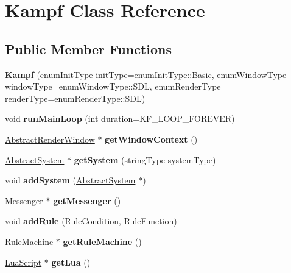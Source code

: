 \hypertarget{classKampf}{\section{Kampf Class Reference}
\label{classKampf}
}
\subsection*{Public Member Functions}
\begin{DoxyCompactItemize}
\item 
\hypertarget{classKampf_aa636c2f7549d48ab59988926e7f96153}{{\bfseries Kampf} (enum\-Init\-Type init\-Type=enum\-Init\-Type\-::\-Basic, enum\-Window\-Type window\-Type=enum\-Window\-Type\-::\-S\-D\-L, enum\-Render\-Type render\-Type=enum\-Render\-Type\-::\-S\-D\-L)}\label{classKampf_aa636c2f7549d48ab59988926e7f96153}

\item 
\hypertarget{classKampf_a52fce0360ced7a06ba48ed77b22cb339}{void {\bfseries run\-Main\-Loop} (int duration=K\-F\-\_\-\-L\-O\-O\-P\-\_\-\-F\-O\-R\-E\-V\-E\-R)}\label{classKampf_a52fce0360ced7a06ba48ed77b22cb339}

\item 
\hypertarget{classKampf_aea0f9a59c692b21d41c0de4c1f68f63d}{\hyperlink{classAbstractRenderWindow}{Abstract\-Render\-Window} $\ast$ {\bfseries get\-Window\-Context} ()}\label{classKampf_aea0f9a59c692b21d41c0de4c1f68f63d}

\item 
\hypertarget{classKampf_afcb1d4930f5697f785343d0dc51a7c85}{\hyperlink{classAbstractSystem}{Abstract\-System} $\ast$ {\bfseries get\-System} (string\-Type system\-Type)}\label{classKampf_afcb1d4930f5697f785343d0dc51a7c85}

\item 
\hypertarget{classKampf_a8461da73a68c946ebb1971810782e0b1}{void {\bfseries add\-System} (\hyperlink{classAbstractSystem}{Abstract\-System} $\ast$)}\label{classKampf_a8461da73a68c946ebb1971810782e0b1}

\item 
\hypertarget{classKampf_a8cc05244779ea8119f685a5fe19a8540}{\hyperlink{classMessenger}{Messenger} $\ast$ {\bfseries get\-Messenger} ()}\label{classKampf_a8cc05244779ea8119f685a5fe19a8540}

\item 
\hypertarget{classKampf_ad2c20f723f0451900d0872f07952acf1}{void {\bfseries add\-Rule} (Rule\-Condition, Rule\-Function)}\label{classKampf_ad2c20f723f0451900d0872f07952acf1}

\item 
\hypertarget{classKampf_aa144a7facce28444612f676468b5c941}{\hyperlink{classRuleMachine}{Rule\-Machine} $\ast$ {\bfseries get\-Rule\-Machine} ()}\label{classKampf_aa144a7facce28444612f676468b5c941}

\item 
\hypertarget{classKampf_a556be71d8f4483e8a6e7116d46bbc706}{\hyperlink{classLuaScript}{Lua\-Script} $\ast$ {\bfseries get\-Lua} ()}\label{classKampf_a556be71d8f4483e8a6e7116d46bbc706}

\end{DoxyCompactItemize}


